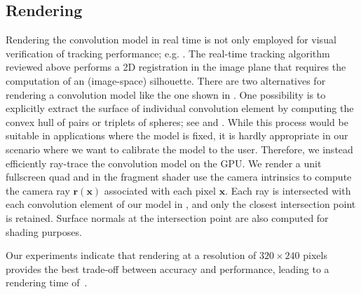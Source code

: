\subsection{Rendering}
\label{sec:rendering}
Rendering the convolution model in real time is not only employed for visual verification of tracking performance; e.g. . The real-time tracking algorithm reviewed above performs a 2D registration in the image plane that requires the computation of an (image-space) silhouette. There are two alternatives for rendering a  convolution model like the one shown in . One possibility is to explicitly extract the surface of individual convolution element by computing the convex hull of pairs or triplets of spheres; see  and \cite{ando2013liquid}. While this process would be suitable in applications where the model is fixed, it is hardly appropriate in our scenario where we want to calibrate the model to the user. Therefore, we instead efficiently ray-trace the convolution model on the GPU. We render a unit fullscreen quad and in the fragment shader use the camera intrinsics to compute the camera ray $\mathbf{r}(\mathbf{x})$ associated with each pixel $\mathbf{x}$. Each ray is intersected with each convolution element of our model in , and only the closest intersection point is retained.  Surface normals at the intersection point are also computed for shading purposes.




Our experiments indicate that rendering at a resolution of $320 \times 240$ pixels provides the best trade-off between accuracy and performance, leading to a rendering time of~.






